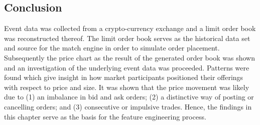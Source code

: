 \subsection{Conclusion}

Event data was collected from a crypto-currency exchange and a limit order book was reconstructed thereof.
The limit order book serves as the historical data set and source for the match engine in order to simulate order placement. 
Subsequently the price chart as the result of the generated order book was shown and an investigation of the underlying event data was proceeded.
Patterns were found which give insight in how market participants positioned their offerings with respect to price and size.
It was shown that the price movement was likely due to (1) an imbalance in bid and ask orders; (2) a distinctive way of posting or cancelling orders; and (3) consecutive or impulsive trades.
Hence, the findings in this chapter serve as the basis for the feature engineering process. 